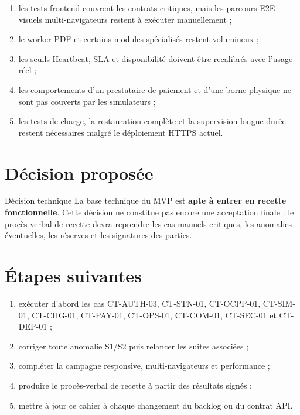 \begin{enumerate}[leftmargin=7mm]
  \item les tests frontend couvrent les contrats critiques, mais les parcours
        E2E visuels multi-navigateurs restent à exécuter manuellement ;
  \item le worker PDF et certains modules spécialisés restent volumineux ;
  \item les seuils Heartbeat, SLA et disponibilité doivent être recalibrés avec
        l'usage réel ;
  \item les comportements d'un prestataire de paiement et d'une borne physique
        ne sont pas couverts par les simulateurs ;
  \item les tests de charge, la restauration complète et la supervision longue
        durée restent nécessaires malgré le déploiement HTTPS actuel.
\end{enumerate}

\section{Décision proposée}

\begin{testbox}{Décision technique}
La base technique du MVP est \textbf{apte à entrer en recette fonctionnelle}.
Cette décision ne constitue pas encore une acceptation finale : le
procès-verbal de recette devra reprendre les cas manuels critiques, les
anomalies éventuelles, les réserves et les signatures des parties.
\end{testbox}

\section{Étapes suivantes}

\begin{enumerate}[leftmargin=7mm]
  \item exécuter d'abord les cas CT-AUTH-03, CT-STN-01, CT-OCPP-01,
        CT-SIM-01, CT-CHG-01, CT-PAY-01, CT-OPS-01, CT-COM-01,
        CT-SEC-01 et CT-DEP-01 ;
  \item corriger toute anomalie S1/S2 puis relancer les suites associées ;
  \item compléter la campagne responsive, multi-navigateurs et performance ;
  \item produire le procès-verbal de recette à partir des résultats signés ;
  \item mettre à jour ce cahier à chaque changement du backlog ou du contrat API.
\end{enumerate}
